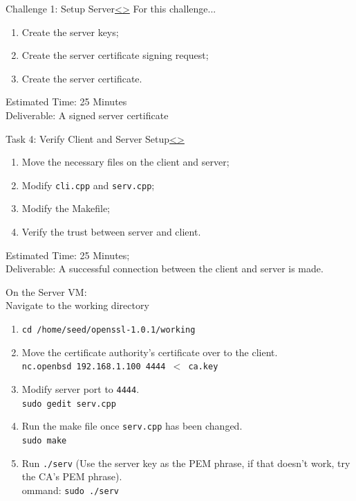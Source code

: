 \documentclass[12pt]{extarticle}
\newenvironment{instructionblock}{\Large\bgroup}{\egroup}
\newcommand{\ben}{\begin{enumerate}}
\newcommand{\een}{\end{enumerate}}
\begin{document}
\pagebreak
\begin{slide}{Challenge 1: Setup Server}{\hyperref[slide 10]{\textless}\hyperref[slide 12]{\textgreater}}
	\begin{instructionblock}
	For this challenge...
		\ben
			\item Create the server keys;
			\item Create the server certificate signing request;
			\item Create the server certificate.
		\een
	\end{instructionblock}
\end{slide} 
\noindent
Estimated Time: 25 Minutes \\
Deliverable: A signed server certificate


\pagebreak
\begin{slide}{Task 4: Verify Client and Server Setup}{\hyperref[slide 11]{\textless}\hyperref[slide 13]{\textgreater}}
	\begin{instructionblock}
		\ben
			\item Move the necessary files on the client and server;
			\item Modify \texttt{cli.cpp} and \texttt{serv.cpp};
			\item Modify the Makefile;
			\item Verify the trust between server and client.
		\een

	\end{instructionblock}
\end{slide} 
\noindent
Estimated Time: 25 Minutes; \\
Deliverable: A successful connection between the client and server is made.\\

\vspace*{10mm}
 
\noindent
On the Server VM:\\
Navigate to the working directory
\ben
	\item \texttt{cd /home/seed/openssl-1.0.1/working}
	\item Move the certificate authority's certificate over to the client.\\
	\texttt{nc.openbsd 192.168.1.100 4444 $<$ ca.key}
	\item Modify server port to \texttt{4444}.\\
	\texttt{sudo gedit serv.cpp} 
	\item Run the make file once \texttt{serv.cpp} has been changed.\\
	\texttt{sudo make}
	\item Run \texttt{./serv} (Use the server key as the PEM phrase, if that doesn't work, try the CA's PEM phrase).\\ ommand: \texttt{sudo ./serv}
\een
\end{document}
